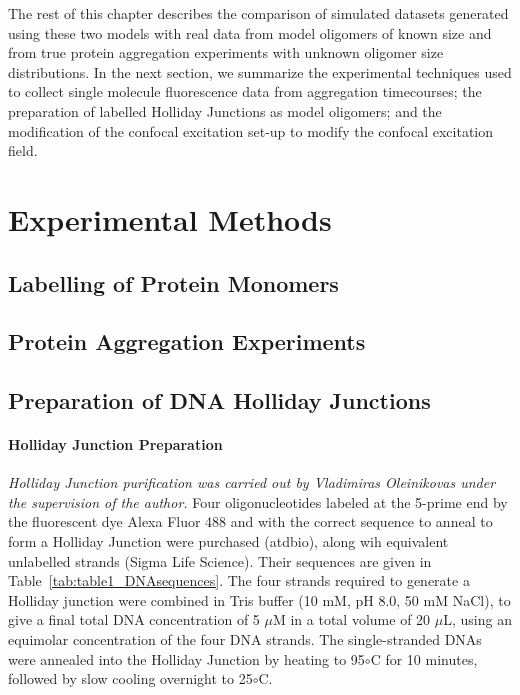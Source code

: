 The rest of this chapter describes the comparison of simulated datasets generated using these two models with real data from model oligomers of known size and from true protein aggregation experiments with unknown oligomer size distributions. In the next section, we summarize the experimental techniques used to collect single molecule fluorescence data from aggregation timecourses; the preparation of labelled Holliday Junctions as model oligomers; and the modification of the confocal excitation set-up to modify the confocal excitation field. 

\section{Experimental Methods}
\subsection{Labelling of Protein Monomers}
\subsection{Protein Aggregation Experiments}
\subsection{Preparation of DNA Holliday Junctions}
\paragraph{Holliday Junction Preparation}
\emph{Holliday Junction purification was carried out by Vladimiras Oleinikovas under the supervision of the author.}
Four oligonucleotides labeled at the 5-prime end by the fluorescent dye Alexa Fluor 488 and with the correct sequence to anneal to form a Holliday Junction were purchased (atdbio), along wih equivalent unlabelled strands (Sigma Life Science). Their sequences are given in Table~\ref{tab:table1_DNAsequences}. The four strands required to generate a Holliday junction were combined in Tris buffer (10 mM, pH 8.0, 50 mM NaCl), to give a final total DNA concentration of 5 $\mu$M in a total volume of 20 $\mu$L, using an equimolar concentration of the four DNA strands. The single-stranded DNAs were annealed into the Holliday Junction by heating to 95$\circ$C for 10 minutes, followed by slow cooling overnight to 25$\circ$C.

